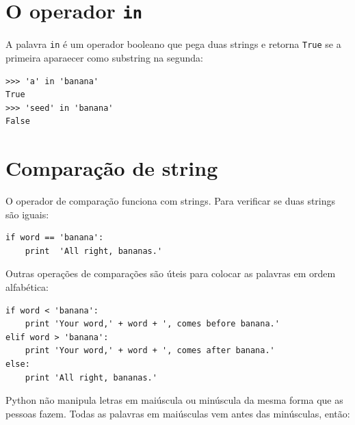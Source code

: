 {%
\section{O operador {\tt in}}
\label{inboth}


A palavra {\tt in} é um operador booleano que pega duas strings e retorna
{\tt True} se a primeira aparaecer como substring na segunda:

\beforeverb
\begin{verbatim}
>>> 'a' in 'banana'
True
>>> 'seed' in 'banana'
False
\end{verbatim}
\afterverb
%

\section{Comparação de string}


O operador de comparação funciona com strings. Para verificar se duas strings
são iguais:

\beforeverb
\begin{verbatim}
if word == 'banana':
    print  'All right, bananas.'
\end{verbatim}
\afterverb
%
%
Outras operações de comparações são úteis para colocar as palavras em ordem
alfabética:

\beforeverb
\begin{verbatim}
if word < 'banana':
    print 'Your word,' + word + ', comes before banana.'
elif word > 'banana':
    print 'Your word,' + word + ', comes after banana.'
else:
    print 'All right, bananas.'
\end{verbatim}
\afterverb
%
%
Python não manipula letras em maiúscula ou minúscula da mesma forma que as
pessoas fazem. Todas as palavras em maiúsculas vem antes das minúsculas, então:

}
